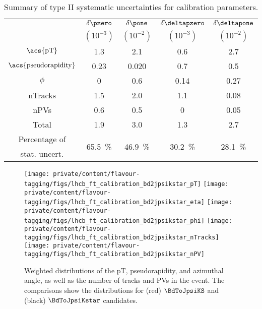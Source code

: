 \begin{table}
  \centering
  \caption{Summary of type II systematic uncertainties for \SSpi calibration
  parameters.}
  \label{tab:flavour_tagging:calibration:ss:systematics}
  \begin{tabular}{ccccc}
    \toprule
      & $\delta\pzero$ & $\delta\pone$ & $\delta\deltapzero$ & $\delta\deltapone$ \\
      & $(10^{-3})$    & $(10^{-2})$   & $(10^{-3})$         & $(10^{-2})$        \\
    \midrule
    $\text{\acs{pT}}$             & 1.3  & 2.1   & 0.6  & 2.7  \\
    $\text{\acs{pseudorapidity}}$ & 0.23 & 0.020 & 0.7  & 0.5  \\
    $\phi$                        & 0    & 0.6   & 0.14 & 0.27 \\
    nTracks                       & 1.5  & 2.0   & 1.1  & 0.08 \\
    nPVs                          & 0.6  & 0.5   & 0    & 0.05 \\
    \midrule
      Total                       & 1.9  & 3.0   & 1.3  & 2.7 \\
    \midrule
    Percentage of & 
    \multirow{2}[2]{*}{\SI{65.5}{\percent}} & 
    \multirow{2}[2]{*}{\SI{46.9}{\percent}} & 
    \multirow{2}[2]{*}{\SI{30.2}{\percent}} & 
    \multirow{2}[2]{*}{\SI{28.1}{\percent}} \\
    stat. uncert. \\
    \bottomrule
  \end{tabular}
\end{table}
%
\begin{figure}
  \centering
  \texttt{[image: private/content/flavour-tagging/figs/lhcb\_ft\_calibration\_bd2jpsikstar\_pT]}
  \texttt{[image: private/content/flavour-tagging/figs/lhcb\_ft\_calibration\_bd2jpsikstar\_eta]}
  \texttt{[image: private/content/flavour-tagging/figs/lhcb\_ft\_calibration\_bd2jpsikstar\_phi]}
  \texttt{[image: private/content/flavour-tagging/figs/lhcb\_ft\_calibration\_bd2jpsikstar\_nTracks]}
  \texttt{[image: private/content/flavour-tagging/figs/lhcb\_ft\_calibration\_bd2jpsikstar\_nPV]}
  \caption{Weighted distributions of the \Bmeson \ac{pT}, \ac{pseudorapidity},
  and azimuthal angle, as well as the number of tracks and \aclp{PV} in the
  event. The comparisons show the distributions for (red) $\BdToJpsiKS$ and
  (black) $\BdToJpsiKstar$ candidates.
  \cite{FT:RunI}
  }
  \label{fig:flavour_tagging:calibration:ss:parameter_distributions}
\end{figure}

